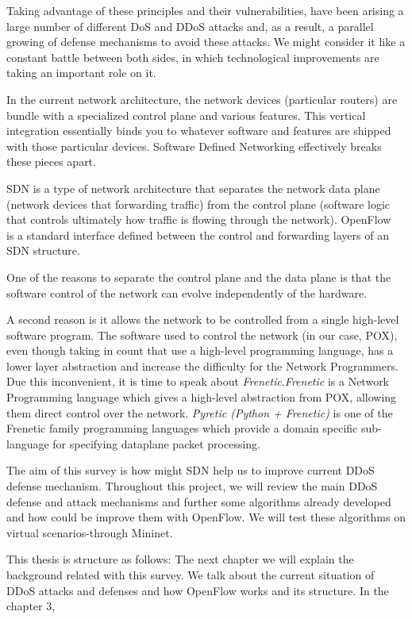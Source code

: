 \bigskip

Taking advantage of these principles and their vulnerabilities, have been arising a large number of different DoS and DDoS attacks and, as a result, a parallel growing of defense mechanisms to avoid these attacks. We might consider it like a constant battle between both sides, in which technological improvements are taking an important role on it. 
 
\par

In the current network architecture, the network devices (particular routers) are bundle with a specialized control plane and various features. This vertical integration essentially binds you to whatever software and features are shipped with those particular devices. Software Defined Networking effectively breaks these pieces apart.

\par

SDN is a type of network architecture that separates the network data plane (network devices that forwarding traffic) from the control plane (software logic that controls ultimately how traffic is flowing through the network). OpenFlow~\cite{OpenFlowWP} is a standard interface defined between the control and forwarding layers of an SDN structure. 

\par

One of the reasons to separate the control plane and the data plane is that the software control of the network can evolve independently of the hardware. 

\par

A second reason is it allows the network to be controlled from a single high-level software program. The software used to control the network (in our case, POX), even though taking in count that use a high-level programming language, has a lower layer abstraction and increase the difficulty for the Network Programmers. Due this inconvenient, it is time to speak about \textit{Frenetic}.\textit{Frenetic} is a Network Programming language which gives a high-level abstraction from POX, allowing them direct control over the network. \textit{Pyretic (Python + Frenetic)} is one of the Frenetic family programming languages which provide a domain specific sub-language for specifying dataplane packet processing.

\par

The aim of this survey is how might SDN help us to improve current DDoS defense mechanism. Throughout this project, we will review the main DDoS defense and attack mechanisms and further some algorithms already developed and how could be improve them with OpenFlow. We will test these algorithms on virtual scenarios-through Mininet.

\bigskip

This thesis is structure as follows: The next chapter we will explain the background related with this survey. We talk about the current situation of DDoS attacks and defenses and how OpenFlow works and its structure. In the chapter 3, 




